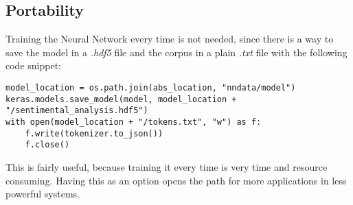 \subsection{Portability}
Training the Neural Network every time is not needed, since there is a way to save the model in a \textit{.hdf5} file and the corpus in a plain \textit{.txt} file with the following code snippet:
\begin{lstlisting}
model_location = os.path.join(abs_location, "nndata/model")
keras.models.save_model(model, model_location + "/sentimental_analysis.hdf5")
with open(model_location + "/tokens.txt", "w") as f:
    f.write(tokenizer.to_json())
    f.close()
\end{lstlisting}
This is fairly useful, because training it every time is very time and resource consuming. Having this as an option opens the path for more applications in less powerful systems.